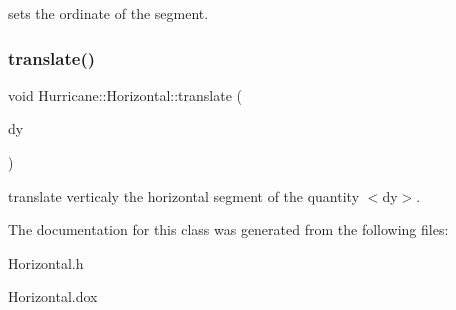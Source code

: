sets the ordinate of the segment. \mbox{\label{classHurricane_1_1Horizontal_a3d01a89cb24cdb29dda86ac9910c7530}} 
\subsubsection{\texorpdfstring{translate()}{translate()}}
{\footnotesize\ttfamily void Hurricane\+::\+Horizontal\+::translate (\begin{DoxyParamCaption}\item[{const \mbox{\hyperlink{group__DbUGroup_ga4fbfa3e8c89347af76c9628ea06c4146}{Db\+U\+::\+Unit}} \&}]{dy }\end{DoxyParamCaption})}

translate verticaly the horizontal segment of the quantity {\ttfamily $<$dy$>$}. 

The documentation for this class was generated from the following files\+:\begin{DoxyCompactItemize}
\item 
Horizontal.\+h\item 
Horizontal.\+dox\end{DoxyCompactItemize}
